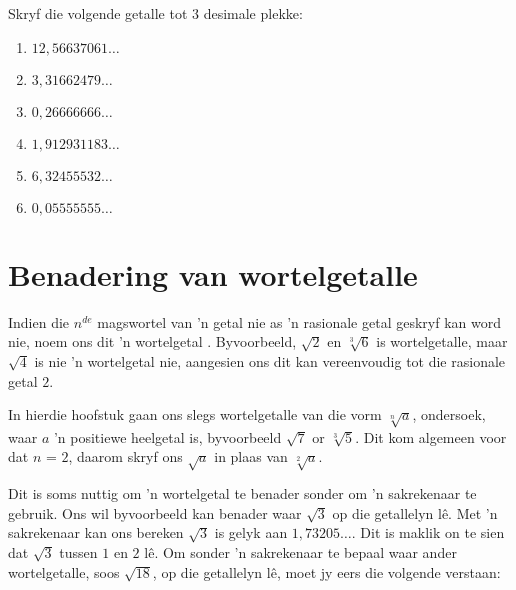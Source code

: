 \begin{exercises}{}
{
Skryf die volgende getalle tot $3$ desimale plekke:
\begin{enumerate}[itemsep=5pt, label=\textbf{\arabic*}. ]
\item $12,56637061\ldots$ %
\item $3,31662479\ldots$ %
\item $0,26666666\ldots$ %
\item $1,912931183\ldots$ %
\item $6,32455532\ldots$ %
\item $0,05555555\ldots$ %
\end{enumerate}

}
\end{exercises}


\section{Benadering van wortelgetalle}

Indien die $n^{de}$ magswortel van ’n getal nie as ’n rasionale getal geskryf kan word nie,  noem ons dit ’n wortelgetal . Byvoorbeeld, $\sqrt{2}$ en $\sqrt[3]{6}$ is wortelgetalle, maar $\sqrt{4}$ is nie ’n wortelgetal nie, aangesien ons dit kan vereenvoudig tot die rasionale getal $2$.\par 
In hierdie hoofstuk gaan ons slegs wortelgetalle van die vorm $\sqrt[n]{a}$, ondersoek, waar  $a$ ’n positiewe heelgetal is, byvoorbeeld $\sqrt{7}$ or $\sqrt[3]{5}$. Dit kom algemeen voor dat $n$ = $2$, daarom skryf ons $\sqrt{a}$ in plaas van $\sqrt[2]{a}$.\par 
Dit is soms nuttig om ’n wortelgetal te benader sonder om ’n sakrekenaar te gebruik. Ons wil byvoorbeeld kan benader waar $\sqrt{3}$ op die getallelyn lê. Met ’n sakrekenaar kan ons bereken $\sqrt{3}$ is gelyk aan $1,73205\ldots$. Dit is maklik on te sien dat $\sqrt{3}$ tussen $1$ en $2$ lê. Om sonder ’n sakrekenaar te bepaal waar ander wortelgetalle, soos $\sqrt{18}$, op die getallelyn lê, moet jy eers die volgende verstaan:\par 


      
